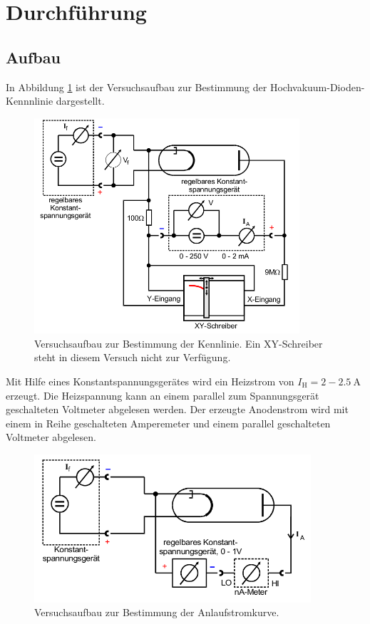 \section{Durchführung}
\label{sec:Durchführung}

\subsection{Aufbau}

In Abbildung \ref{fig:Aufbau} ist der Versuchsaufbau zur Bestimmung der
Hochvakuum-Dioden-Kennnlinie dargestellt.

\begin{figure}
  \centering
  \includegraphics[height=8cm]{SommerAlbum15/Aufbau.png}
  \caption{Versuchsaufbau zur Bestimmung der Kennlinie. Ein XY-Schreiber steht
  in diesem Versuch nicht zur Verfügung.\cite{anleitung}}
  \label{fig:Aufbau}
\end{figure}

\FloatBarrier

Mit Hilfe eines Konstantspannungsgerätes wird ein Heizstrom von
$I_\text{H} = 2-\SI{2.5}{\ampere}$ erzeugt. Die Heizspannung kann an einem
parallel zum Spannungsgerät geschalteten Voltmeter abgelesen werden.
Der erzeugte Anodenstrom wird mit einem in Reihe geschalteten Amperemeter und
einem parallel geschalteten Voltmeter abgelesen.

\begin{figure}
  \centering
  \includegraphics[height=5.5cm]{SommerAlbum15/Aufbau2.png}
  \caption{Versuchsaufbau zur Bestimmung der Anlaufstromkurve.\cite{anleitung}}
  \label{fig:Aufbau2}
\end{figure}

